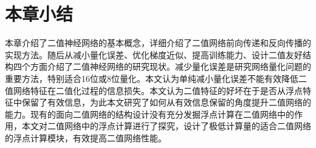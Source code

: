 \section{本章小结}

本章介绍了二值神经网络的基本概念，详细介绍了二值网络前向传递和反向传播的实现方法。随后从减小量化误差、优化梯度近似、提高训练能力、设计二值友好结构四个方面介绍了二值神经网络的研究现状。减少量化误差是研究网络量化问题的重要方法，特别适合16位或8位量化。本文认为单纯减小量化误差不能有效降低二值网络特征在二值化过程的信息损失。本文认为二值特征的好坏在于是否从浮点特征中保留了有效信息，为此本文研究了如何从有效信息保留的角度提升二值网络的能力。现有的面向二值网络的结构设计没有充分发掘浮点计算在二值网络中的作用，本文对二值网络中的浮点计算进行了探究，设计了极低计算量的适合二值网络的浮点计算模块，有效提高二值网络性能。